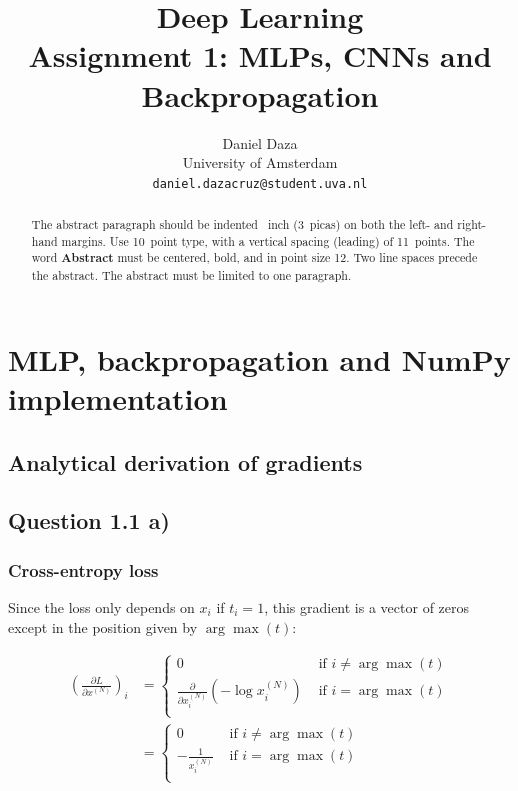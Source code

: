 \documentclass{article}
\title{Deep Learning\\Assignment 1: MLPs, CNNs and Backpropagation}
\author{%
  Daniel Daza\\
  University of Amsterdam\\
  \texttt{daniel.dazacruz@student.uva.nl} \\
}
\begin{document}

\maketitle

\begin{abstract}
  The abstract paragraph should be indented ~inch (3~picas) on
  both the left- and right-hand margins. Use 10~point type, with a vertical
  spacing (leading) of 11~points.  The word \textbf{Abstract} must be centered,
  bold, and in point size 12. Two line spaces precede the abstract. The abstract
  must be limited to one paragraph.
\end{abstract}

\section{MLP, backpropagation and NumPy implementation}

\subsection{Analytical derivation of gradients}

\subsection*{Question 1.1 a)}

\subsubsection*{Cross-entropy loss}

Since the loss only depends on $x_i$ if $t_i = 1$, this gradient is a vector of zeros except in the position given by $\arg\max(t)$:

\begin{align}
\left(\frac{\partial L}{\partial x^{(N)}} \right)_i &=
\left\lbrace
\begin{matrix}
0 &\text{ if } i \neq \arg\max(t)\\
\frac{\partial}{\partial x_i^{(N)}}\left(-\log x_i^{(N)}\right) &\text{ if } i = \arg\max(t)\\
\end{matrix}
\right.\\
&= \left\lbrace
\begin{matrix}
0 &\text{ if } i \neq \arg\max(t)\\
-\frac{1}{x_i^{(N)}} &\text{ if } i = \arg\max(t)\\
\end{matrix}
\right.
\end{align}
\end{document}
